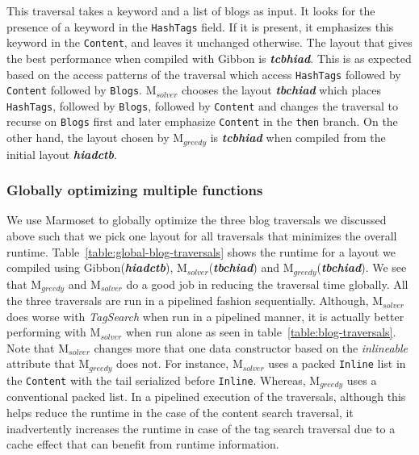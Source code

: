 \documentclass[acmsmall,review,anonymous]{acmart}\settopmatter{printfolios=true,printccs=false,printacmref=false}
\newcommand{\system}{{\sc Marmoset}\xspace}
\newcommand{\systemSolver}{{\sc M$_{\mathit{solver}}$}\xspace}
\newcommand{\systemGreedy}{{\sc M$_{\mathit{greedy}}$}\xspace}
\newcommand{\gibbon}{{\sc Gibbon}\xspace}
\begin{document}
This traversal takes a keyword and a list of blogs as input. It looks for the presence of a keyword in the \lstinline{HashTags} field.
If it is present, it emphasizes this keyword in the \lstinline{Content}, and leaves it unchanged otherwise.
The layout that gives the best performance when compiled with \gibbon is \textbf{\textit{tcbhiad}}. This is as expected based on the 
access patterns of the traversal which access \lstinline{HashTags} followed by \lstinline{Content} followed by \lstinline{Blogs}.
\systemSolver chooses the layout \textbf{\textit{tbchiad}} which places \lstinline|HashTags|, followed by \lstinline|Blogs|, 
followed by \lstinline|Content| and changes the traversal to recurse on \lstinline|Blogs| first and later emphasize
\lstinline|Content| in the \lstinline|then| branch. On the other hand, the layout chosen by \systemGreedy is \textbf{\textit{tcbhiad}}
when compiled from the initial layout \textbf{\textit{hiadctb}}.




\subsubsection{\bf Globally optimizing multiple functions}

We use \system to globally optimize the three blog traversals we discussed above such that we pick one layout for all traversals that minimizes the overall runtime.
Table~\ref{table:global-blog-traversals} shows the runtime for a layout we compiled using \gibbon (\textit{\textbf{hiadctb}}), \systemSolver(\textit{\textbf{tbchiad}}) 
and \systemGreedy(\textit{\textbf{tbchiad}}). We see that \systemGreedy and \systemSolver do a good job in reducing the traversal time globally. 
All the three traversals are run in a pipelined fashion sequentially. Although, \systemSolver does worse with \textit{TagSearch} when run in a pipelined manner, 
it is actually better performing with \systemSolver when run alone as seen in table~\ref{table:blog-traversals}. 
Note that \systemSolver changes more that one data constructor based on the \textit{inlineable} attribute that \systemGreedy does not.
For instance, \systemSolver uses a packed \lstinline|Inline| list in the \lstinline|Content| with the tail serialized before \lstinline|Inline|.
Whereas, \systemGreedy uses a conventional packed list. In a pipelined execution of the traversals, although this helps reduce the runtime in the case 
of the content search traversal, it inadvertently increases the runtime in case of the tag search traversal due to a cache effect
that can benefit from runtime information.
\end{document}
